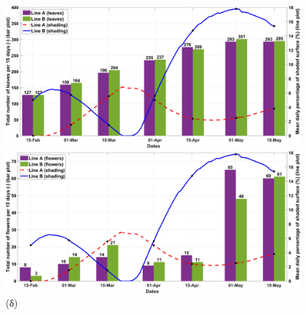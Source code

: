 \documentclass[12pt, a4paper]{report} %
\begin{document}
\begin{figure}[H]
\begin{adjustwidth}{-0.5cm}{0cm}
        \begin{minipage}[c]{0.5\textwidth}
            \centering
            \includegraphics[scale=0.05]{leaves_flowers_c.jpg}
            \caption*{\hspace{35pt}(γ)}{}
        \end{minipage}
        \hfill
        \begin{minipage}[c]{0.5\textwidth}
            \centering
            \includegraphics[scale=0.05]{leaves_flowers_d.jpg}
            \caption*{\hspace{35pt}(δ)}{}
        \end{minipage}

        \medskip


\end{adjustwidth}
\end{figure}
\end{document}
